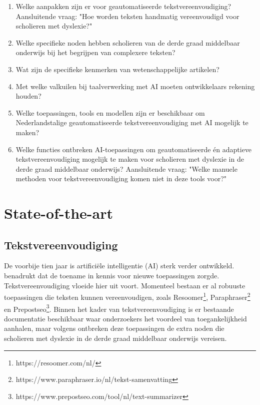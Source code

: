   

\begin{enumerate}
	\item Welke aanpakken zijn er voor geautomatiseerde tekstvereenvoudiging? Aansluitende vraag: "Hoe worden teksten handmatig vereenvoudigd voor scholieren met dyslexie?"
	\item Welke specifieke noden hebben scholieren van de derde graad middelbaar onderwijs bij het begrijpen van complexere teksten?
	\item Wat zijn de specifieke kenmerken van wetenschappelijke artikelen? 
	\item Met welke valkuilen bij taalverwerking met AI moeten ontwikkelaars rekening houden?
	\item Welke toepassingen, tools en modellen zijn er beschikbaar om Nederlandstalige geautomatiseerde tekstvereenvoudiging met AI mogelijk te maken?
	\item Welke functies ontbreken AI-toepassingen om geautomatiseerde én adaptieve tekstvereenvoudiging mogelijk te maken voor \newline scholieren met dyslexie in de derde graad \newline middelbaar onderwijs? Aansluitende vraag: "Welke manuele methoden voor tekstvereenvoudiging komen niet in deze tools voor?"
\end{enumerate}


\section{State-of-the-art}%
\label{sec:state-of-the-art}

\subsection{Tekstvereenvoudiging}

De voorbije tien jaar is artificiële intelligentie (AI) sterk verder ontwikkeld. \textcite{Vasista2022} benadrukt dat de toename in kennis voor nieuwe toepassingen zorgde. Tekstvereenvoudiging vloeide hier uit voort. Momenteel bestaan er al robuuste toepassingen die teksten kunnen vereenvoudigen, zoals Resoomer\footnote{https://resoomer.com/nl/}, Paraphraser\footnote{https://www.paraphraser.io/nl/tekst-samenvatting} en Prepostseo\footnote{https://www.prepostseo.com/tool/nl/text-summarizer}. Binnen het kader van tekstvereenvoudiging is er bestaande documentatie beschikbaar waar onderzoekers het voordeel van toegankelijkheid aanhalen, maar volgens \textcite{Gooding2022} ontbreken deze toepassingen de extra noden die scholieren met dyslexie in de derde graad middelbaar onderwijs vereisen.

